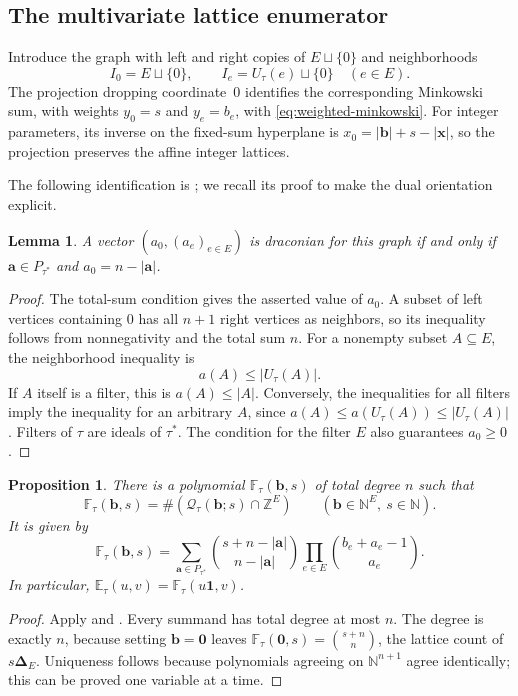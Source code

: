 \documentclass[11pt,letterpaper]{article}
\newtheorem{proposition}[proposition]{Proposition}
\newtheorem{lemma}[lemma]{Lemma}
\theoremstyle{definition}
\newcommand{\N}{\mathbb N}
\newcommand{\Z}{\mathbb Z}
\newcommand{\one}{\mathbf 1}
\newcommand{\zero}{\mathbf 0}
\newcommand{\bvec}{\mathbf b}
\newcommand{\avec}{\mathbf a}
\newcommand{\xvec}{\mathbf x}
\newcommand{\QQ}{\mathcal Q}
\newcommand{\EE}{\mathbb E}
\newcommand{\FF}{\mathbb F}
\newcommand{\ds}{\boldsymbol\Delta}
\newcommand{\card}[1]{\lvert #1\rvert}
\newcommand{\sumv}[1]{\lvert #1\rvert}
\begin{document}
\subsection{The multivariate lattice enumerator}
Introduce the graph with left and right copies of $E\sqcup\{0\}$ and
neighborhoods
\[
 I_0=E\sqcup\{0\},\qquad I_e=U_\tau(e)\sqcup\{0\}\quad(e\in E).
\]
The projection dropping coordinate~$0$ identifies the corresponding
Minkowski sum, with weights $y_0=s$ and $y_e=b_e$, with
\eqref{eq:weighted-minkowski}. For integer parameters, its inverse on the
fixed-sum hyperplane is
$x_0=\sumv{\bvec}+s-\sumv{\xvec}$, so the projection preserves the affine
integer lattices.

The following identification is \cite[Lemma~4.1]{AC26}; we recall its
proof to make the dual orientation explicit.

\begin{lemma}\label{lem:draconian-preorder}
A vector $(a_0,(a_e)_{e\in E})$ is draconian for this graph if and only if
$\avec\in P_{\tau^*}$ and $a_0=n-\sumv{\avec}$.
\end{lemma}
\begin{proof}
The total-sum condition gives the asserted value of $a_0$. A subset of left
vertices containing $0$ has all $n+1$ right vertices as neighbors, so its
inequality follows from nonnegativity and the total sum $n$. For a nonempty
subset $A\subseteq E$, the neighborhood inequality is
\[
 a(A)\leq\card{U_\tau(A)}.
\]
If $A$ itself is a filter, this is $a(A)\leq\card A$. Conversely, the
inequalities for all filters imply the inequality for an arbitrary $A$,
since $a(A)\leq a(U_\tau(A))\leq\card{U_\tau(A)}$. Filters of $\tau$
are ideals of $\tau^*$. The condition for the filter $E$ also guarantees
$a_0\geq0$.
\end{proof}

\begin{proposition}\label{prop:F}
There is a polynomial $\FF_\tau(\bvec,s)$ of total degree $n$ such that
\[
 \FF_\tau(\bvec,s)=\#(\QQ_\tau(\bvec;s)\cap\Z^E)
 \qquad(\bvec\in\N^E,\ s\in\N).
\]
It is given by
\begin{equation}\label{eq:rising}
 \boxed{\FF_\tau(\bvec,s)=
 \sum_{\avec\in P_{\tau^*}}
   \binom{s+n-\sumv{\avec}}{n-\sumv{\avec}}
   \prod_{e\in E}\binom{b_e+a_e-1}{a_e}.}
\end{equation}
In particular, $\EE_\tau(u,v)=\FF_\tau(u\one,v)$.
\end{proposition}
\begin{proof}
Apply  and . Every summand
has total degree at most $n$. The degree is exactly $n$, because setting
$\bvec=\zero$ leaves
$\FF_\tau(\zero,s)=\binom{s+n}{n}$, the lattice count of $s\ds_E$.
Uniqueness follows because polynomials agreeing on $\N^{n+1}$ agree
identically; this can be proved one variable at a time.
\end{proof}
\end{document}
